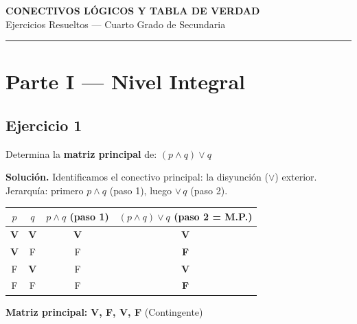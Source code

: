 \documentclass[12pt,a4paper]{article}
\newcommand{\V}{\textbf{V}}
\newcommand{\F}{F}
\newcommand{\resultado}[1]{\textcolor{verde}{\textbf{#1}}}
\begin{document}
\begin{center}
  {\LARGE\bfseries\color{primario} CONECTIVOS LÓGICOS Y TABLA DE VERDAD}\\[4pt]
  {\large Ejercicios Resueltos — Cuarto Grado de Secundaria}\\[2pt]
  \textcolor{gray}{\rule{0.6\linewidth}{0.6pt}}
\end{center}

\vspace{6pt}

\section{Parte I — Nivel Integral}

\subsection*{Ejercicio 1}

\begin{enunciado}
Determina la \textbf{matriz principal} de: $(p \wedge q) \vee q$
\end{enunciado}

\begin{solucion}
\textbf{Solución.} Identificamos el conectivo principal: la disyunción ($\vee$) exterior.
Jerarquía: primero $p \wedge q$ (paso 1), luego $\vee\, q$ (paso 2).

\medskip
\begin{center}
\begin{tabular}{cc|c|c}
\toprule
$p$ & $q$ & $p \wedge q$ \scriptsize{(paso 1)} & $(p \wedge q) \vee q$ \scriptsize{(paso 2 = M.P.)} \\
\midrule
\V & \V & \V & \resultado{V} \\
\V & \F & \F & \resultado{F} \\
\F & \V & \F & \resultado{V} \\
\F & \F & \F & \resultado{F} \\
\bottomrule
\end{tabular}
\end{center}

\textbf{Matriz principal:} \resultado{V, F, V, F} \quad (Contingente)
\end{solucion}
\end{document}
